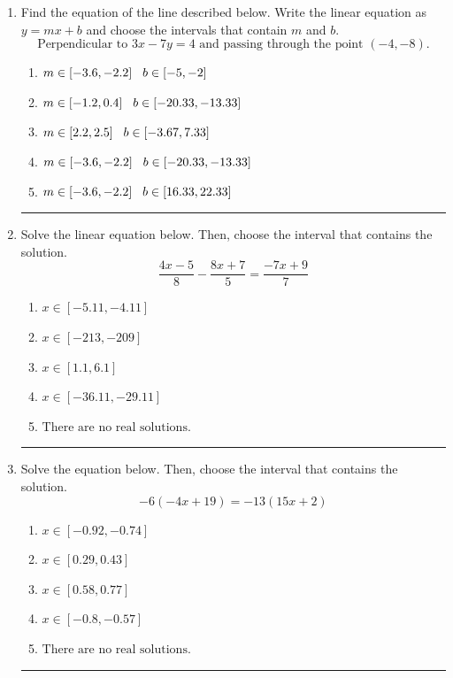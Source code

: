 \documentclass[14pt]{extbook}
\newcommand{\litem}[1]{\item#1\hspace*{-1cm}\rule{\textwidth}{0.4pt}}
\begin{document}
\begin{enumerate}
{\begin{enumerate}[label=\Alph*.]
\end{enumerate} }
\litem{
Find the equation of the line described below. Write the linear equation as $ y=mx+b $ and choose the intervals that contain $m$ and $b$.\[ \text{Perpendicular to } 3 x - 7 y = 4 \text{ and passing through the point } (-4, -8). \]\begin{enumerate}[label=\Alph*.]
\item \( m \in [-3.6, -2.2] \hspace*{3mm} b \in [-5, -2] \)
\item \( m \in [-1.2, 0.4] \hspace*{3mm} b \in [-20.33, -13.33] \)
\item \( m \in [2.2, 2.5] \hspace*{3mm} b \in [-3.67, 7.33] \)
\item \( m \in [-3.6, -2.2] \hspace*{3mm} b \in [-20.33, -13.33] \)
\item \( m \in [-3.6, -2.2] \hspace*{3mm} b \in [16.33, 22.33] \)

\end{enumerate} }
\litem{
Solve the linear equation below. Then, choose the interval that contains the solution.\[ \frac{4x -5}{8} - \frac{8x + 7}{5} = \frac{-7x + 9}{7} \]\begin{enumerate}[label=\Alph*.]
\item \( x \in [-5.11, -4.11] \)
\item \( x \in [-213, -209] \)
\item \( x \in [1.1, 6.1] \)
\item \( x \in [-36.11, -29.11] \)
\item \( \text{There are no real solutions.} \)

\end{enumerate} }
\litem{
Solve the equation below. Then, choose the interval that contains the solution.\[ -6(-4x + 19) = -13(15x + 2) \]\begin{enumerate}[label=\Alph*.]
\item \( x \in [-0.92, -0.74] \)
\item \( x \in [0.29, 0.43] \)
\item \( x \in [0.58, 0.77] \)
\item \( x \in [-0.8, -0.57] \)
\item \( \text{There are no real solutions.} \)

\end{enumerate} }
\end{enumerate}
\end{document}
